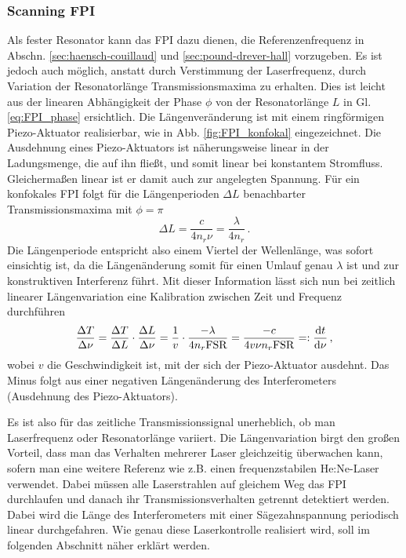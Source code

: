 \subsubsection{Scanning FPI}\label{subsubsec:scanning_FPI}
Als fester Resonator kann das FPI dazu dienen, die
Referenzenfrequenz in Abschn. \ref{sec:haensch-couillaud} und
\ref{sec:pound-drever-hall} vorzugeben. Es ist jedoch auch möglich, anstatt
durch Verstimmung der Laserfrequenz, durch Variation der Resonatorlänge
Transmissionsmaxima zu erhalten. Dies ist leicht aus der linearen Abhängigkeit
der Phase $\phi$ von der Resonatorlänge $L$ in Gl. \eqref{eq:FPI_phase}
ersichtlich. Die Längenveränderung ist mit einem ringförmigen Piezo-Aktuator
realisierbar, wie in Abb. \ref{fig:FPI_konfokal} eingezeichnet. Die Ausdehnung
eines Piezo-Aktuators ist näherungsweise linear in der Ladungsmenge, die auf ihn
fließt, und somit linear bei konstantem Stromfluss. Gleichermaßen linear ist er
damit auch zur angelegten Spannung. Für ein konfokales FPI folgt für die
Längenperioden $\Delta L$ benachbarter Transmissionsmaxima mit $\phi=\pi$
\begin{equation}\label{eq:FPI_laengenperiode}
	\Delta L=\frac{c}{4n_r\nu}=\frac{\lambda}{4n_r}\,.
\end{equation}
Die Längenperiode entspricht also einem Viertel der Wellenlänge, was sofort
einsichtig ist, da die Längenänderung somit für einen Umlauf genau $\lambda$ ist
und zur konstruktiven Interferenz führt. Mit dieser Information lässt sich nun
bei zeitlich linearer Längenvariation eine Kalibration zwischen Zeit und
Frequenz durchführen
\begin{equation}\label{eq:FPI_zeit-eichung}
	\frac{\Delta T}{\Delta\nu}=\frac{\Delta T}{\Delta L}\cdot\frac{\Delta
	L}{\Delta\nu}=\frac{1}{v}\cdot\frac{-\lambda}{4n_r\text{FSR}}=\frac{-c}{4v\nu
	n_r\text{FSR}}=:\frac{\mathrm{d} t}{\mathrm{d} \nu}\,,
\end{equation}
wobei $v$ die Geschwindigkeit ist, mit der sich der Piezo-Aktuator ausdehnt.
Das Minus folgt aus einer negativen Längenänderung des Interferometers
(Ausdehnung des Piezo-Aktuators).\par
Es ist also für das zeitliche Transmissionssignal unerheblich, ob man
Laserfrequenz oder Resonatorlänge variiert. Die Längenvariation birgt den großen
Vorteil, dass man das Verhalten mehrerer Laser gleichzeitig überwachen kann,
sofern man eine weitere Referenz wie z.B. einen frequenzstabilen He:Ne-Laser
verwendet.
Dabei müssen alle Laserstrahlen auf gleichem Weg das FPI durchlaufen und
danach ihr Transmissionsverhalten getrennt detektiert werden. Dabei wird
die Länge des Interferometers mit einer
Sägezahnspannung periodisch linear durchgefahren. Wie genau
diese Laserkontrolle realisiert wird, soll im folgenden Abschnitt näher erklärt werden.

